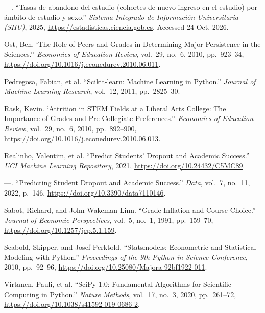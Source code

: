 \begin{list}{}{\setlength{\leftmargin}{1.5em}\setlength{\itemindent}{-1.5em}\setlength{\itemsep}{0.25em}\setlength{\parsep}{0pt}}
\item ---. ``Tasas de abandono del estudio (cohortes de nuevo ingreso en el estudio) por \'ambito de estudio y sexo.'' \textit{Sistema Integrado de Informaci\'on Universitaria (SIIU)}, 2025, \url{https://estadisticas.ciencia.gob.es}. Accessed 24 Oct. 2026.
\item Ost, Ben. `The Role of Peers and Grades in Determining Major Persistence in the Sciences.'' \textit{Economics of Education Review}, vol.~29, no.~6, 2010, pp.~923--34, \url{https://doi.org/10.1016/j.econedurev.2010.06.011}.
\item Pedregosa, Fabian, et al. ``Scikit-learn: Machine Learning in Python.'' \textit{Journal of Machine Learning Research}, vol.~12, 2011, pp.~2825--30.
\item Rask, Kevin. `Attrition in STEM Fields at a Liberal Arts College: The Importance of Grades and Pre-Collegiate Preferences.'' \textit{Economics of Education Review}, vol.~29, no.~6, 2010, pp.~892--900, \url{https://doi.org/10.1016/j.econedurev.2010.06.013}.
\item Realinho, Valentim, et al. ``Predict Students' Dropout and Academic Success.'' \textit{UCI Machine Learning Repository}, 2021, \url{https://doi.org/10.24432/C5MC89}.
\item ---. ``Predicting Student Dropout and Academic Success.'' \textit{Data}, vol.~7, no.~11, 2022, p.~146, \url{https://doi.org/10.3390/data7110146}.
\item Sabot, Richard, and John Wakeman-Linn. ``Grade Inflation and Course Choice.'' \textit{Journal of Economic Perspectives}, vol.~5, no.~1, 1991, pp.~159--70, \url{https://doi.org/10.1257/jep.5.1.159}.
\item Seabold, Skipper, and Josef Perktold. ``Statsmodels: Econometric and Statistical Modeling with Python.'' \textit{Proceedings of the 9th Python in Science Conference}, 2010, pp.~92--96, \url{https://doi.org/10.25080/Majora-92bf1922-011}.
\item Virtanen, Pauli, et al. ``SciPy 1.0: Fundamental Algorithms for Scientific Computing in Python.'' \textit{Nature Methods}, vol.~17, no.~3, 2020, pp.~261--72, \url{https://doi.org/10.1038/s41592-019-0686-2}.

\end{list}

